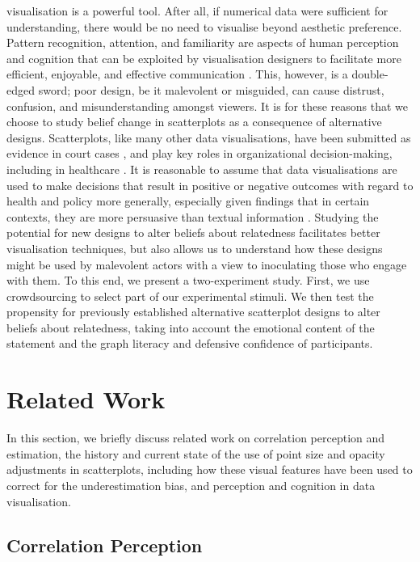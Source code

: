 \documentclass[sigconf]{acmart}
\begin{document}
visualisation is a powerful tool. After all, if numerical data were
sufficient for understanding, there would be no need to visualise beyond
aesthetic preference. Pattern recognition, attention, and familiarity
are aspects of human perception and cognition that can be exploited by
visualisation designers to facilitate more efficient, enjoyable, and
effective communication \citep{franconeri_2021}. This, however, is a
double-edged sword; poor design, be it malevolent or misguided, can
cause distrust, confusion, and misunderstanding amongst viewers. It is
for these reasons that we choose to study belief change in scatterplots
as a consequence of alternative designs. Scatterplots, like many other
data visualisations, have been submitted as evidence in court cases
\citep{bobko_1979}, and play key roles in organizational
decision-making, including in healthcare \citep{poly_2019}. It is
reasonable to assume that data visualisations are used to make decisions
that result in positive or negative outcomes with regard to health and
policy more generally, especially given findings that in certain
contexts, they are more persuasive than textual information
\citep{pandey_2014}. Studying the potential for new designs to alter
beliefs about relatedness facilitates better visualisation techniques,
but also allows us to understand how these designs might be used by
malevolent actors with a view to inoculating those who engage with them.
To this end, we present a two-experiment study. First, we use
crowdsourcing to select part of our experimental stimuli. We then test
the propensity for previously established alternative scatterplot
designs to alter beliefs about relatedness, taking into account the
emotional content of the statement and the graph literacy and defensive
confidence of participants.

\section{Related Work}\label{sec-rel-work-main}

In this section, we briefly discuss related work on correlation
perception and estimation, the history and current state of the use of
point size and opacity adjustments in scatterplots, including how these
visual features have been used to correct for the underestimation bias,
and perception and cognition in data visualisation.

\subsection{Correlation Perception}\label{sec-corr-percept}
\end{document}
